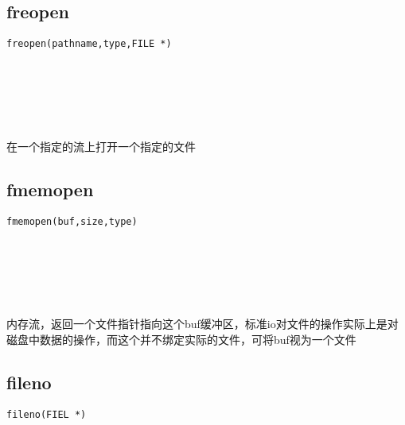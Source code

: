 \documentclass[10pt,a4paper]{article}
\begin{document}
\subsection{freopen}
\begin{spacing}{2.0}
\lstset{language=C,numbers=none}
\begin{lstlisting}
freopen(pathname,type,FILE *)
\end{lstlisting}
{\large\color[rgb]{0.2,0.4,0.6}{pathname:}} \\
{\large\color[rgb]{0.2,0.4,0.6}{type:}} \\
{\large\color[rgb]{0.2,0.4,0.6}{*:}}
\paragraph{ \ \ }在一个指定的流上打开一个指定的文件
\end{spacing}

\subsection{fmemopen}
\begin{spacing}{2.0}
\lstset{language=C,numbers=none}
\begin{lstlisting}
fmemopen(buf,size,type)
\end{lstlisting}
{\large\color[rgb]{0.2,0.4,0.6}{buf:}} \\
{\large\color[rgb]{0.2,0.4,0.6}{size:}} \\
{\large\color[rgb]{0.2,0.4,0.6}{type:}}
\paragraph{ \ \ }内存流，返回一个文件指针指向这个buf缓冲区，标准io对文件的操作实际上是对磁盘中数据的操作，而这个并不绑定实际的文件，可将buf视为一个文件
\end{spacing}

\subsection{fileno}
\begin{spacing}{2.0}
\lstset{language=C,numbers=none}
\begin{lstlisting}
fileno(FIEL *)
\end{lstlisting}
{\large\color[rgb]{0.2,0.4,0.6}{*:}}
\paragraph{ \ \ }
\end{spacing}
\end{document}
